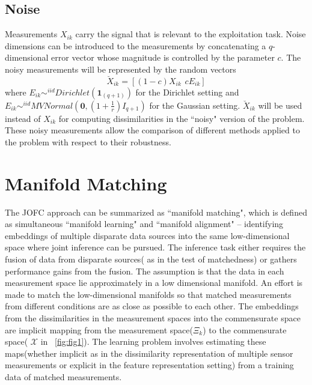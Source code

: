 \documentclass[11pt]{article} %
\begin{document}
\subsection{Noise\label{noise}}
Measurements $X_{ik}$ carry the signal that is relevant to the exploitation task. Noise dimensions can be introduced to  the measurements by concatenating a $q$-dimensional error vector whose magnitude is controlled by the parameter $c$. The noisy measurements will be  represented by the random vectors 
 \begin{equation}
\breve{X}_{ik}=[(1-c)X_{ik}\hspace{5pt} cE_{ik}]\label{eq:noise-expr}
\end{equation}
 where $E_{ik} \sim^{iid} Dirichlet(\bm{1}_{(q+1)})\label{eq:noise-model-dir} $ for the Dirichlet setting and $E_{ik} \sim^{iid} MVNormal(\bm{0} , (1+\frac{1}{r})I_{q+1}) \label{eq:noise-model-mvn} $ for the Gaussian setting. $\breve{X}_{ik}$ will be used instead of ${X}_{ik}$ for computing dissimilarities in the ``noisy" version of the problem. These noisy measurements allow the comparison of  different methods applied to the problem with respect to their robustness.
  

\section{Manifold Matching\label{sec:JOFC}}
  The JOFC approach can be summarized as  ``manifold matching", which is defined as simultaneous ``manifold learning" and ``manifold alignment" -- identifying embeddings of multiple disparate data sources into the same low-dimensional space where joint inference can be pursued. The inference task either requires the fusion of data from disparate sources( as in the test of matchedness) or gathers performance gains from the fusion. The assumption is that the data in each measurement space lie approximately in a low dimensional manifold. An effort is made to match the low-dimensional manifolds so that matched measurements from different conditions are as close as possible to each other.  The embeddings from the dissimilarities in the measurement spaces into the commensurate space are implicit mapping from the measurement space($\Xi_k$)  to the commensurate space( $\mathcal{X}$ in ~\ref{fig:fig1}). The learning problem involves estimating these maps(whether implicit as in the dissimilarity representation of multiple sensor measurements or explicit in the  feature representation setting)  from a training data of matched measurements.
\end{document}
